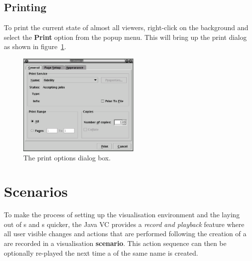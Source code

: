 \subsection{Printing}

To print the current state of almost all viewers, right-click on the
background and select the \textbf{Print} option from the popup menu.
This will bring up the print dialog as shown in
figure~\ref{fig:printdialog}.

\begin{figure}[htp]
\centering
\includegraphics[width=6cm]{vcprintdialog}
\caption{The print options dialog box.}
\label{fig:printdialog}
\end{figure}


\section{Scenarios}
\label{sec:scenarios}

To make the process of setting up the visualisation environment and
the laying out of \viewer{}s and \viewlet{}s quicker, the Java VC
provides a \emph{record and playback} feature where all user visible
changes and actions that are performed following the creation of a
\viewable{} are recorded in a visualisation \textbf{scenario}.  This
action sequence can then be optionally re-played the next time a
\viewable{} of the same name is created.

